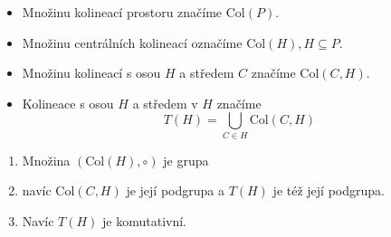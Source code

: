 \begin{definition}
    \begin{itemize}
	\item Množinu kolineací prostoru značíme $\mathrm{Col}(P)$.
        \item Množinu centrálních kolineací označíme $\mathrm{Col}(H), H \subseteq P$.
        \item Množinu kolineací s osou $H$ a středem $C$ značíme $\mathrm{Col}(C,H)$.
        \item Kolineace s osou $H$ a středem v $H$ značíme
		\[ T(H) = \bigcup_{C \in H} \mathrm{Col}(C,H) \]
    \end{itemize}
\end{definition}

\begin{theorem}\label{kpp:kolin_group}
	\begin{enumerate}
		\item Množina $(\mathrm{Col}(H), \circ)$ je grupa
		\item navíc $\mathrm{Col}(C,H)$ je její podgrupa a $T(H)$ je též její podgrupa.
		\item Navíc $T(H)$ je komutativní.
	\end{enumerate}
\end{theorem}
